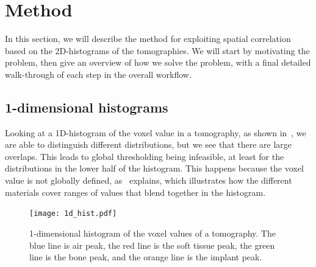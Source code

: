 \section{Method}
\label{sec:method}

In this section, we will describe the method for exploiting spatial correlation based on the
2D-histograms of the tomographies. We will start by motivating the problem, then give an overview
of how we solve the problem, with a final detailed walk-through of each step in the overall workflow.

\subsection{1-dimensional histograms}
Looking at a 1D-histogram of the voxel value in a tomography, as shown in~, we are
able to distinguish different distributions, but we see that there are large overlaps. This leads to
global thresholding being infeasible, at least for the distributions in the lower half of the histogram.
This happens because the voxel value is not globally defined, as~ explains, which
illustrates how the different materials cover ranges of values that blend together in the histogram.

\begin{figure}
    \centering
    \texttt{[image: 1d\_hist.pdf]}
    \caption{1-dimensional histogram of the voxel values of a tomography. The blue line is air peak,
    the red line is the soft tissue peak, the green line is the bone peak, and the orange line is
    the implant peak.}
    \label{fig:1d-hist}
\end{figure}

